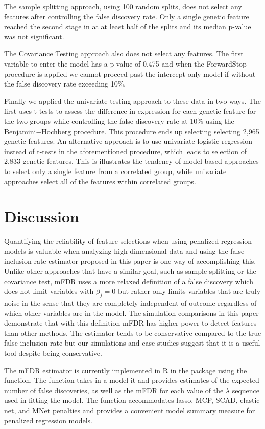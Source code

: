 The sample splitting approach, using 100 random splits, does not select any features after controlling the false discovery rate. Only a single genetic feature reached the second stage in at at least half of the splits and its median p-value was not significant. 

The Covariance Testing approach also does not select any features.  The first variable to enter the model has a p-value of 0.475 and when the ForwardStop procedure is applied we cannot proceed past the intercept only model if without the false discovery rate exceeding 10\%.

Finally we applied the univariate testing approach to these data in two ways.  The first uses t-tests to assess the difference in expression for each genetic feature for the two groups while controlling the false discovery rate at 10\% using the Benjamini$-$Hochberg procedure.  This procedure ends up selecting selecting 2,965 genetic features. An alternative approach is to use univariate logistic regression instead of t-tests in the aforementioned procedure, which leads to selection of 2,833 genetic features.  This is illustrates the tendency of model based approaches to select only a single feature from a correlated group, while univariate approaches select all of the features within correlated groups. 

\section{Discussion}
Quantifying the reliability of feature selections when using penalized regression models is valuable when analyzing high dimensional data and using the false inclusion rate estimator proposed in this paper is one way of accomplishing this.  Unlike other approaches that have a similar goal, such as sample splitting or the covariance test, mFDR uses a more relaxed definition of a false discovery which does not limit variables with $\beta_j = 0$ but rather only limits variables that are truly noise in the sense that they are completely independent of outcome regardless of which other variables are in the model.  The simulation comparisons in this paper demonstrate that with this definition mFDR has higher power to detect features than other methods.  The estimator tends to be conservative compared to the true false inclusion rate but our simulations and case studies suggest that it is a useful tool despite being conservative.

The mFDR estimator is currently implemented in R in the  package \citep{Breheny2011} using the  function.  The function takes in a model it and provides estimates of the expected number of false discoveries, as well as the mFDR for each value of the $\lambda$ sequence used in fitting the model.  The function accommodates lasso, MCP, SCAD, elastic net, and MNet \citep{Huang2016} penalties and provides a convenient model summary measure for penalized regression models.

